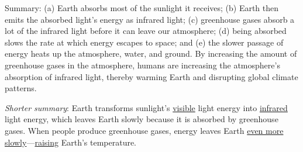 Summary: (a) Earth absorbs most of the sunlight it receives; (b) Earth then
emits the absorbed light's energy as infrared light; (c) greenhouse gases absorb
a lot of the infrared light before it can leave our atmosphere; (d) being
absorbed slows the rate at which energy escapes to space; and (e) the slower
passage of energy heats up the atmosphere, water, and ground. By increasing the
amount of greenhouse gases in the atmosphere, humans are increasing the
atmosphere's absorption of infrared light, thereby warming Earth and disrupting
global climate patterns.

\emph{Shorter summary}: Earth transforms sunlight's \underline{visible} light
energy into \underline{infrared} light energy, which leaves Earth slowly because
it is absorbed by greenhouse gases. When people produce greenhouse gases, energy
leaves Earth \underline{even more slowly}---\underline{raising} Earth's temperature.
